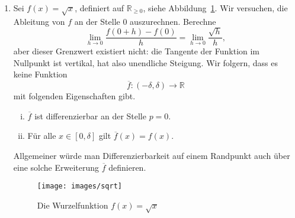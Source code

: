 \documentclass[../main.tex]{subfiles}
\begin{document}
\begin{examples}
  \leavevmode
  \begin{enumerate}[(1)]
    \item Sei $f(x) = \sqrt x$,
      definiert auf $\mathbb{R}_{\geq 0}$,
      siehe Abbildung~\ref{fig:sqrt}.
      Wir versuchen, die Ableitung
      von $f$ an der Stelle $0$ auszurechnen.
      Berechne
      \[
        \lim_{h \to 0} \frac{f(0 + h) - f(0)}{h}
        = \lim_{h \to 0} \frac{\sqrt h}{h},
      \]
      aber dieser Grenzwert existiert nicht:
      die Tangente der Funktion im Nullpunkt
      ist vertikal, hat also unendliche Steigung.
      Wir folgern, dass es keine Funktion
      \[
      \overline f \colon (- \delta, \delta) \to \mathbb{R}
      \]
      mit folgenden Eigenschaften gibt.
      \begin{enumerate}[(i)]
        \item $\overline f$ ist differenzierbar
          an der Stelle $p = 0$.
        \item Für alle $x \in [0, \delta]$ gilt
          $\overline f (x) = f(x)$.
      \end{enumerate}
      Allgemeiner würde man Differenzierbarkeit auf
      einem Randpunkt auch über eine solche
      Erweiterung $\overline f$ definieren.

      \begin{figure}[htb]
        \centering
        \texttt{[image: images/sqrt]}
        \caption{Die Wurzelfunktion $f(x) = \sqrt x$}%
        \label{fig:sqrt}
      \end{figure}


\end{enumerate}
\end{examples}
\end{document}
